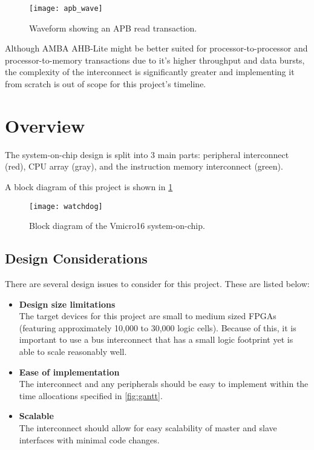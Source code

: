 \begin{figure}[H]
\centering
\texttt{[image: apb\_wave]}
\caption{Waveform showing an APB read transaction.}
\end{figure}

Although AMBA AHB-Lite \cite{armahb} might be better suited for processor-to-processor and processor-to-memory transactions due to it's higher throughput and data bursts, the complexity of the interconnect is significantly greater and implementing it from scratch is out of scope for this project's timeline.

\section{Overview}
The system-on-chip design is split into 3 main parts: peripheral interconnect (red), CPU array (gray), and the instruction memory interconnect (green).

A block diagram of this project is shown in \cref{fig:watchdog}
\begin{figure}[H]
\centering
\texttt{[image: watchdog]}
\caption{Block diagram of the Vmicro16 system-on-chip.}
\label{fig:watchdog}
\end{figure}

\subsection{Design Considerations}
There are several design issues to consider for this project. These are listed below:

\begin{itemize}
\item \textbf{Design size limitations}\\
The target devices for this project are small to medium sized FPGAs (featuring approximately 10,000 to 30,000 logic cells). Because of this, it is important to use a bus interconnect that has a small logic footprint yet is able to scale reasonably well.

\item \textbf{Ease of implementation}\\
The interconnect and any peripherals should be easy to implement within the time allocations specified in \cref{fig:gantt}.

\item \textbf{Scalable}\\
The interconnect should allow for easy scalability of master and slave interfaces with minimal code changes.
\end{itemize}

